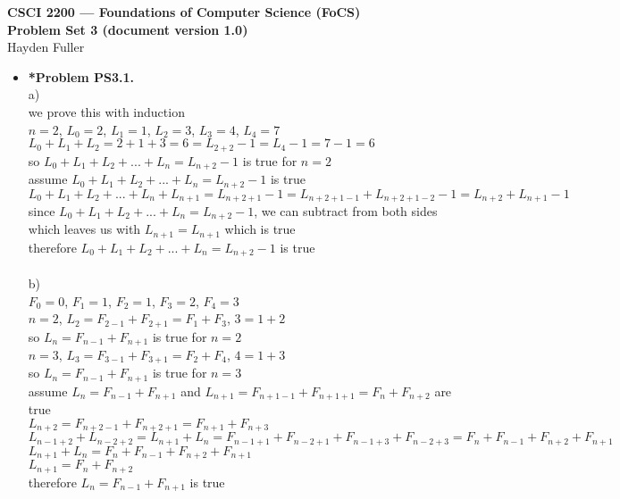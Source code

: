 \documentclass[11pt]{article}
\begin{document}
\thispagestyle{empty}   %

\begin{center}
\large
\textbf{CSCI 2200 --- Foundations of Computer Science (FoCS) \\
Problem Set 3 (document version 1.0)}
\\Hayden Fuller
\end{center}


\begin{itemize}

\item \textbf{*Problem PS3.1.}
\\a)
\\we prove this with induction
\\$n=2$, $L_0=2$, $L_1=1$, $L_2=3$, $L_3=4$, $L_4=7$
\\$L_0+L_1+L_2=2+1+3=6=L_{2+2}-1=L_4-1=7-1=6$
\\so $L_0+L_1+L_2+...+L_n=L_{n+2}-1$ is true for $n=2$
\\assume $L_0+L_1+L_2+...+L_n=L_{n+2}-1$ is true
\\$L_0+L_1+L_2+...+L_n+L_{n+1}=L_{n+2+1}-1=L_{n+2+1-1}+L_{n+2+1-2}-1=L_{n+2}+L_{n+1}-1$
\\since  $L_0+L_1+L_2+...+L_n=L_{n+2}-1$, we can subtract from both sides which leaves us with $L_{n+1}=L_{n+1}$ which is true
\\therefore  $L_0+L_1+L_2+...+L_n=L_{n+2}-1$ is true
\\
\\b)
\\$F_0=0$, $F_1=1$, $F_2=1$, $F_3=2$, $F_4=3$
\\$n=2$, $L_2=F_{2-1}+F_{2+1}=F_1+F_3$, $3=1+2$
\\so $L_n=F_{n-1}+F_{n+1}$ is true for $n=2$
\\$n=3$, $L_3=F_{3-1}+F_{3+1}=F_2+F_4$, $4=1+3$
\\so $L_n=F_{n-1}+F_{n+1}$ is true for $n=3$
\\assume $L_n=F_{n-1}+F_{n+1}$ and  $L_{n+1}=F_{n+1-1}+F_{n+1+1}=F_{n}+F_{n+2}$ are true
\\$L_{n+2}=F_{n+2-1}+F_{n+2+1}=F_{n+1}+F_{n+3}$
\\$L_{n-1+2}+L_{n-2+2}=L_{n+1}+L_{n}=F_{n-1+1}+F_{n-2+1}+F_{n-1+3}+F_{n-2+3}=F_{n}+F_{n-1}+F_{n+2}+F_{n+1}$
\\$L_{n+1}+L_{n}=F_{n}+F_{n-1}+F_{n+2}+F_{n+1}$
\\$L_{n+1}=F_{n}+F_{n+2}$
\\therefore $L_n=F_{n-1}+F_{n+1}$ is true




\end{itemize}
\end{document}
